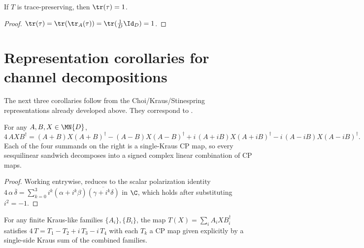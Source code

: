 \begin{theorem}\label{thm:trace_choiMatrix_of_tp}
    \leanok
    If $T$ is trace-preserving, then $\tr(\tau) = 1$.
\end{theorem}

\begin{proof}
    \leanok
    $\tr(\tau)
        = \tr(\tr_A(\tau))
        = \tr(\frac{1}{D}\Id_D)
        = 1$.
\end{proof}

\section{Representation corollaries for channel decompositions}
\label{sec:representation_corollaries}

The next three corollaries follow from the Choi/Kraus/Stinespring
representations already developed above. They correspond to
\cite[Propositions~2.2--2.4]{Wolf2012Quantum}.

\begin{theorem}
    \label{thm:polarization_sandwich}
    \leanok
    For any $A, B, X \in \MN{D}$,
    \[
        4\,A X B^\dagger
        = (A+B) X (A+B)^\dagger - (A-B) X (A-B)^\dagger
        + i\,(A + iB) X (A + iB)^\dagger
        - i\,(A - iB) X (A - iB)^\dagger.
    \]
    Each of the four summands on the right is a single-Kraus CP map, so
    every sesquilinear sandwich decomposes into a signed complex linear
    combination of CP maps.
\end{theorem}

\begin{proof}
    \leanok
    Working entrywise, reduces to the scalar polarization identity
    $4\,\alpha\,\overline{\delta}
        = \sum_{k=0}^{3} i^k (\alpha + i^k \beta)\overline{(\gamma + i^k \delta)}$
    in $\C$, which holds after substituting $i^2 = -1$.
\end{proof}

\begin{theorem}
    \label{thm:cp_decomposition_of_sandwich_sum}
    \leanok
    For any finite Kraus-like families $\{A_i\}, \{B_i\}$, the map
    $T(X) = \sum_i A_i X B_i^\dagger$ satisfies
    $4\,T = T_1 - T_2 + i\,T_3 - i\,T_4$ with each $T_k$ a CP map given
    explicitly by a single-side Kraus sum of the combined families.
\end{theorem}

